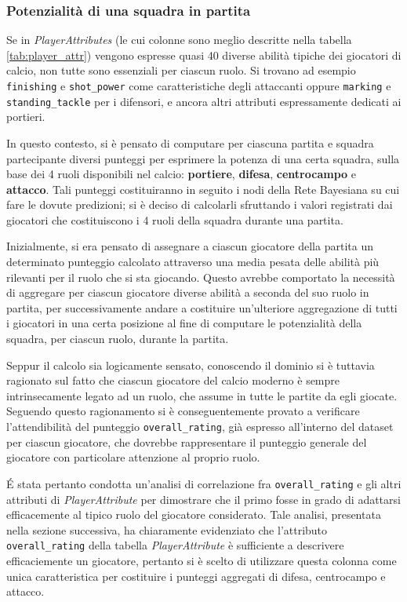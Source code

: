 \documentclass[hidelinks, 12pt]{article}
\begin{document}
\subsubsection{Potenzialità di una squadra in partita}

Se in \textit{PlayerAttributes} (le cui colonne sono meglio descritte nella tabella \ref{tab:player_attr}) vengono espresse quasi 40 diverse abilità tipiche dei giocatori di calcio, non tutte sono essenziali per ciascun ruolo. Si trovano ad esempio \texttt{finishing} e \texttt{shot\_power} come caratteristiche degli attaccanti oppure \texttt{marking} e \texttt{standing\_tackle} per i difensori, e ancora altri attributi espressamente dedicati ai portieri.

In questo contesto, si è pensato di computare per ciascuna partita e squadra partecipante diversi punteggi per esprimere la potenza di una certa squadra, sulla base dei 4 ruoli disponibili nel calcio: \textbf{portiere}, \textbf{difesa}, \textbf{centrocampo} e \textbf{attacco}. Tali punteggi costituiranno in seguito i nodi della Rete Bayesiana su cui fare le dovute predizioni; si è deciso di calcolarli sfruttando i valori registrati dai giocatori che costituiscono i 4 ruoli della squadra durante una partita.

\vspace{3ex}

Inizialmente, si era pensato di assegnare a ciascun giocatore della partita un determinato punteggio calcolato attraverso una media pesata delle abilità più rilevanti per il ruolo che si sta giocando. Questo avrebbe comportato la necessità di aggregare per ciascun giocatore diverse abilità a seconda del suo ruolo in partita, per successivamente andare a costituire un'ulteriore aggregazione di tutti i giocatori in una certa posizione al fine di computare le potenzialità della squadra, per ciascun ruolo, durante la partita. 

Seppur il calcolo sia logicamente sensato, conoscendo il dominio si è tuttavia ragionato sul fatto che ciascun giocatore del calcio moderno è sempre intrinsecamente legato ad un ruolo, che assume in tutte le partite da egli giocate. Seguendo questo ragionamento si è conseguentemente provato a verificare l'attendibilità del punteggio \texttt{overall\_rating}, già espresso all'interno del dataset per ciascun giocatore, che dovrebbe rappresentare il punteggio generale del giocatore con particolare attenzione al proprio ruolo. 

É stata pertanto condotta un'analisi di correlazione fra \texttt{overall\_rating} e gli altri attributi di \textit{PlayerAttribute} per dimostrare che il primo fosse in grado di adattarsi efficacemente al tipico ruolo del giocatore considerato. Tale analisi, presentata nella sezione successiva, ha chiaramente evidenziato che l'attributo \texttt{overall\_rating} della tabella \textit{PlayerAttribute} è sufficiente a descrivere efficaciemente un giocatore, pertanto si è scelto di utilizzare questa colonna come unica caratteristica per costituire i punteggi aggregati di difesa, centrocampo e attacco. 
\end{document}
